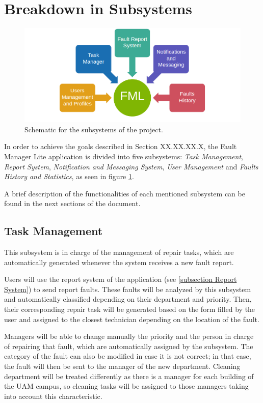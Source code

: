 \section{Breakdown in Subsystems}

\begin{figure}[hbtp]
\centering
\includegraphics[scale=0.5]{img/subsystems.png}
\caption{Schematic for the subsystems of the project.}
\label{figSubsystems}
\end{figure}

In order to achieve the goals described in Section XX.XX.XX.X, the Fault Manager Lite application is divided into five subsystems: \emph{Task Management}, \emph{Report System}, \emph{Notification and Messaging System}, \emph{User Management} and \emph{Faults History and Statistics}, as seen in figure \ref{figSubsystems}.

A brief description of the functionalities of each mentioned subsystem can be found in the next sections of the document.

\subsection{Task Management}
\label{subsection Task Management}

This subsystem is in charge of the management of repair tasks, which are automatically generated whenever the system receives a new fault report.

Users will use the report system of the application (see \ref{subsection Report System}) to send report faults. These faults will be analyzed by this subsystem and automatically classified depending on their department and priority. Then, their corresponding repair task will be generated based on the form filled by the user and assigned to the closest technician depending on the location of the fault.

Managers will be able to change manually the priority and the person in charge of repairing that fault, which are automatically assigned by the subsystem. The category of the fault can also be modified in case it is not correct; in that case, the fault will then be sent to the manager of the new department. Cleaning department will be treated differently as there is a manager for each building of the UAM campus, so cleaning tasks will be assigned to those managers taking into account this characteristic.

